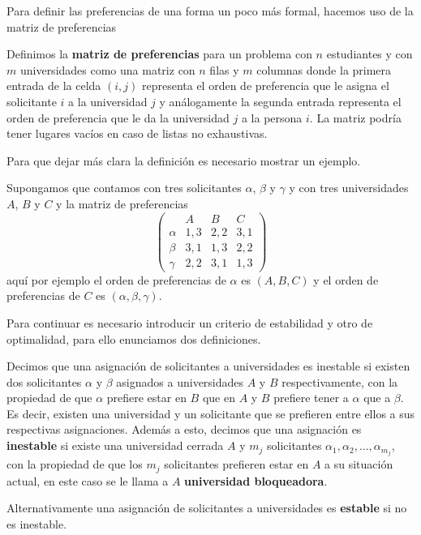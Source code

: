 Para definir las preferencias de una forma un poco más formal, hacemos uso de la matriz de preferencias

\begin{dfn}
\label{matpref}
Definimos la \textbf{matriz de preferencias} para un problema con $n$ estudiantes y con $m$ universidades como una matriz con $n$ filas y $m$ columnas donde la primera entrada de la celda $(i,j)$ representa el orden de preferencia que le asigna el solicitante $i$ a la universidad $j$ y análogamente la segunda entrada representa el orden de preferencia que le da la universidad $j$ a la persona $i$. La matriz podría tener lugares vacíos en caso de listas no exhaustivas. 
\end{dfn}

Para que dejar más clara la definición es necesario mostrar un ejemplo. 

\begin{eje}
\label{ejemplo matrimonio 1}
Supongamos que contamos con tres solicitantes $\alpha$, $\beta$ y $\gamma$ y con tres universidades $A$, $B$ y $C$ y la matriz de preferencias
$$\begin{pmatrix}
& A & B & C \\
\alpha & 1,3 & 2,2 & 3,1 \\
\beta & 3,1 & 1,3 & 2,2 \\
\gamma & 2,2 & 3,1 & 1,3 
\end{pmatrix}$$
aquí por ejemplo el orden de preferencias de $\alpha$ es $(A,B,C)$ y el orden de preferencias de $C$ es $(\alpha, \beta, \gamma)$.
\fin
\end{eje}


Para continuar es necesario introducir un criterio de estabilidad y otro de optimalidad, para ello enunciamos dos definiciones. 

\begin{dfn}{\cite{GaleShapley}}
\label{Estable}
Decimos que una asignación de solicitantes a universidades es inestable si existen dos solicitantes $\alpha$ y $\beta$ asignados a universidades $A$ y $B$ respectivamente, con la propiedad de que $\alpha$ prefiere estar en $B$ que en $A$ y $B$ prefiere tener a $\alpha$ que a $\beta$. Es decir, existen una universidad y un solicitante que se prefieren entre ellos a sus respectivas asignaciones. 
Además a esto, decimos que una asignación es \textbf{inestable} si existe una universidad cerrada $A$ y $m_j$ solicitantes $\alpha_1,\alpha_2,\dots,\alpha_{m_j}$, con la propiedad de que los $m_j$ solicitantes prefieren estar en $A$ a su situación actual, en este caso se le llama a $A$ \textbf{universidad bloqueadora}.

Alternativamente una asignación de solicitantes a universidades es \textbf{estable} si no es inestable.
\end{dfn}

